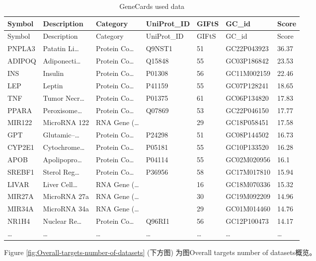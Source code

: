 \documentclass[
]{article}
\begin{document}
\begin{longtable}[]{@{}lllllll@{}}
\caption{\label{tab:GeneCards-used-data}GeneCards used data}\tabularnewline
\toprule
Symbol & Description & Category & UniProt\_ID & GIFtS & GC\_id & Score\tabularnewline
\midrule
\endfirsthead
\toprule
Symbol & Description & Category & UniProt\_ID & GIFtS & GC\_id & Score\tabularnewline
\midrule
\endhead
PNPLA3 & Patatin Li\ldots{} & Protein Co\ldots{} & Q9NST1 & 51 & GC22P043923 & 36.37\tabularnewline
ADIPOQ & Adiponecti\ldots{} & Protein Co\ldots{} & Q15848 & 55 & GC03P186842 & 23.53\tabularnewline
INS & Insulin & Protein Co\ldots{} & P01308 & 56 & GC11M002159 & 22.46\tabularnewline
LEP & Leptin & Protein Co\ldots{} & P41159 & 55 & GC07P128241 & 18.65\tabularnewline
TNF & Tumor Necr\ldots{} & Protein Co\ldots{} & P01375 & 61 & GC06P134820 & 17.83\tabularnewline
PPARA & Peroxisome\ldots{} & Protein Co\ldots{} & Q07869 & 53 & GC22P046150 & 17.77\tabularnewline
MIR122 & MicroRNA 122 & RNA Gene (\ldots{} & & 29 & GC18P058451 & 17.58\tabularnewline
GPT & Glutamic--\ldots{} & Protein Co\ldots{} & P24298 & 51 & GC08P144502 & 16.73\tabularnewline
CYP2E1 & Cytochrome\ldots{} & Protein Co\ldots{} & P05181 & 55 & GC10P133520 & 16.28\tabularnewline
APOB & Apolipopro\ldots{} & Protein Co\ldots{} & P04114 & 55 & GC02M020956 & 16.1\tabularnewline
SREBF1 & Sterol Reg\ldots{} & Protein Co\ldots{} & P36956 & 58 & GC17M017810 & 15.94\tabularnewline
LIVAR & Liver Cell\ldots{} & RNA Gene (\ldots{} & & 16 & GC18M070336 & 15.32\tabularnewline
MIR27A & MicroRNA 27a & RNA Gene (\ldots{} & & 30 & GC19M092209 & 14.96\tabularnewline
MIR34A & MicroRNA 34a & RNA Gene (\ldots{} & & 29 & GC01M014460 & 14.76\tabularnewline
NR1H4 & Nuclear Re\ldots{} & Protein Co\ldots{} & Q96RI1 & 56 & GC12P100473 & 14.17\tabularnewline
\ldots{} & \ldots{} & \ldots{} & \ldots{} & \ldots{} & \ldots{} & \ldots{}\tabularnewline
\bottomrule
\end{longtable}

\begin{center}\vspace{1.5cm}\end{center}

\begin{center}\vspace{1.5cm}\end{center}

Figure \ref{fig:Overall-targets-number-of-datasets} (下方图) 为图Overall targets number of datasets概览。
\end{document}
